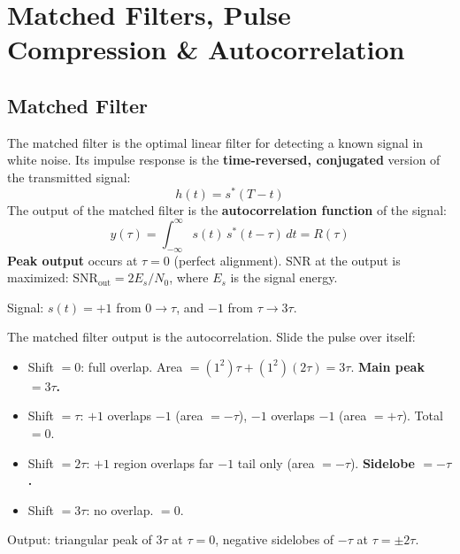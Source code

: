 \documentclass[10pt,letterpaper]{article}
\begin{document}
\section{Matched Filters, Pulse Compression \& Autocorrelation}

\subsection{Matched Filter}

\begin{tcolorbox}[formulabox, title={Matched Filter}]
The matched filter is the optimal linear filter for detecting a known signal in white noise. Its impulse response is the \textbf{time-reversed, conjugated} version of the transmitted signal:
\begin{equation}
  h(t) = s^*(T - t)
\end{equation}
The output of the matched filter is the \textbf{autocorrelation function} of the signal:
\begin{equation}
  y(\tau) = \int_{-\infty}^{\infty} s(t)\,s^*(t-\tau)\,dt = R(\tau)
\end{equation}
\textbf{Peak output} occurs at $\tau = 0$ (perfect alignment). SNR at the output is maximized: $\mathrm{SNR}_\mathrm{out} = 2E_s/N_0$, where $E_s$ is the signal energy.
\end{tcolorbox}

\begin{tcolorbox}[examplebox, title={HW5 P2 Example: Non-Standard Matched Filter Output}]
Signal: $s(t) = +1$ from $0\to\tau$, and $-1$ from $\tau\to3\tau$.

The matched filter output is the autocorrelation. Slide the pulse over itself:
\begin{itemize}[noitemsep]
  \item Shift $= 0$: full overlap. Area $= (1^2)\tau + (1^2)(2\tau) = 3\tau$. \textbf{Main peak $= 3\tau$.}
  \item Shift $= \tau$: $+1$ overlaps $-1$ (area $= -\tau$), $-1$ overlaps $-1$ (area $= +\tau$). Total $= 0$.
  \item Shift $= 2\tau$: $+1$ region overlaps far $-1$ tail only (area $= -\tau$). \textbf{Sidelobe $= -\tau$.}
  \item Shift $= 3\tau$: no overlap. $= 0$.
\end{itemize}
Output: triangular peak of $3\tau$ at $\tau=0$, negative sidelobes of $-\tau$ at $\tau=\pm2\tau$.
\end{tcolorbox}
\end{document}

